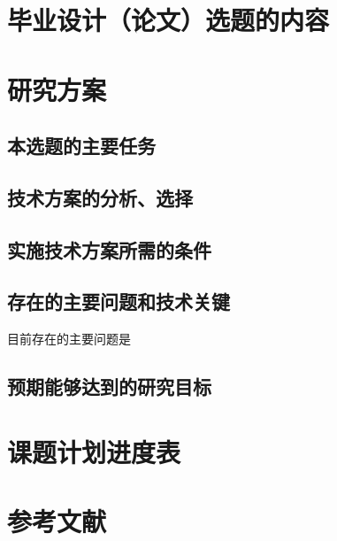 \documentclass[UTF8,AutoFakeBold,AutoFakeSlant,12pt]{ctexart}
\begin{document}




\pagestyle{fancy}
\setcounter{page}{1}
\fancyhf{}
\fancyhead[R]{\fontsize{10.5pt}{10.5pt}\selectfont{北京理工大学本科生毕业设计（论文）开题报告}}
\fancyfoot[R]{\fontsize{9pt}{9pt}\selectfont{\thepage}}
\renewcommand{\headrulewidth}{1pt}
\renewcommand{\footrulewidth}{0pt}

\setlength{\parindent}{1.02cm}

\section{毕业设计（论文）选题的内容}
\lipsum[1]

\section{研究方案}
\subsection{本选题的主要任务}
\lipsum[2]

\subsection{技术方案的分析、选择}
\lipsum[3-5]

\subsection{实施技术方案所需的条件}

\subsection{存在的主要问题和技术关键}
目前存在的主要问题是

\subsection{预期能够达到的研究目标}

\section{课题计划进度表}

\section{参考文献}
\end{document}
